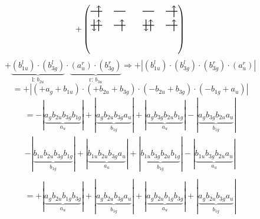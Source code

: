 \documentclass{article}
\begin{document}
\vspace{0.5cm}

\[+\left(\begin{tikzpicture}
    \draw[thick] (0,0) -- (0.5,0); %
    \draw[thick] (1,0) -- (1.5,0); %
    \draw[thick] (0,-0.6) -- (0.5,-0.6); %
    \draw[thick] (1,-0.6) -- (1.5,-0.6); %
\draw[->, thick] (0.35, -0.25) -- (0.35, 0.25); 
\draw[-> , thick] (0.35, -0.85) -- (0.35, -0.35); 
\draw[<- , thick] (0.15, -0.85) -- (0.15, -0.35); 
 \draw[-> , thick] (1.35, -0.85) -- (1.35, -0.35); 
\end{tikzpicture}\qquad \begin{tikzpicture}
    \draw[thick] (0,0) -- (0.5,0); %
    \draw[thick] (1,0) -- (1.5,0); %
    \draw[thick] (0,-0.6) -- (0.5,-0.6); %
    \draw[thick] (1,-0.6) -- (1.5,-0.6); %
\draw[->, thick] (1.35, -0.25) -- (1.35, 0.25); 
\draw[-> , thick] (0.35, -0.85) -- (0.35, -0.35); 
\draw[<- , thick] (0.15, -0.85) -- (0.15, -0.35); 
 \draw[-> , thick] (1.35, -0.85) -- (1.35, -0.35); 
\end{tikzpicture}\right)\]$$+ \underbrace{(b_{1u}^{l})\cdot (b_{3g}^{l})}_{\text{l: }b_{2u}}\cdot \underbrace{(a_{u}^{r})\cdot (b_{3g}^{r})}_{\text{r: }b_{3u}}\Rightarrow +\left|(b_{1u}^{l}) \cdot (b_{3g}^{l}) \cdot (b_{3g}^{r}) \cdot (a_{u}^{r})\right|$$$$=+\left|(+a_{g}+b_{1u}) \cdot (+b_{2u}+b_{3g}) \cdot (-b_{2u}+b_{3g}) \cdot (-b_{1g}+a_{u})\right|$$\begin{multline*}
=-\left|\underbrace{a_{g} b_{2u} b_{3g} b_{1g}}_{a_{u}}\right|+\left|\underbrace{a_{g} b_{2u} b_{3g} a_{u}}_{b_{1g}}\right|+\left|\underbrace{a_{g} b_{3g} b_{2u} b_{1g}}_{a_{u}}\right|-\left|\underbrace{a_{g} b_{3g} b_{2u} a_{u}}_{b_{1g}}\right|\\
-\left|\underbrace{b_{1u} b_{2u} b_{3g} b_{1g}}_{b_{1g}}\right|+\left|\underbrace{b_{1u} b_{2u} b_{3g} a_{u}}_{a_{u}}\right|+\left|\underbrace{b_{1u} b_{3g} b_{2u} b_{1g}}_{b_{1g}}\right|-\left|\underbrace{b_{1u} b_{3g} b_{2u} a_{u}}_{a_{u}}\right|\\
\end{multline*}\begin{multline*}
=+\left|\underbrace{a_{g} b_{2u} b_{1g} b_{3g}}_{a_{u}}\right|+\left|\underbrace{a_{g} b_{2u} b_{3g} a_{u}}_{b_{1g}}\right|+\left|\underbrace{a_{g} b_{2u} b_{1g} b_{3g}}_{a_{u}}\right|+\left|\underbrace{a_{g} b_{2u} b_{3g} a_{u}}_{b_{1g}}\right|\\

\end{multline*}
\end{document}
